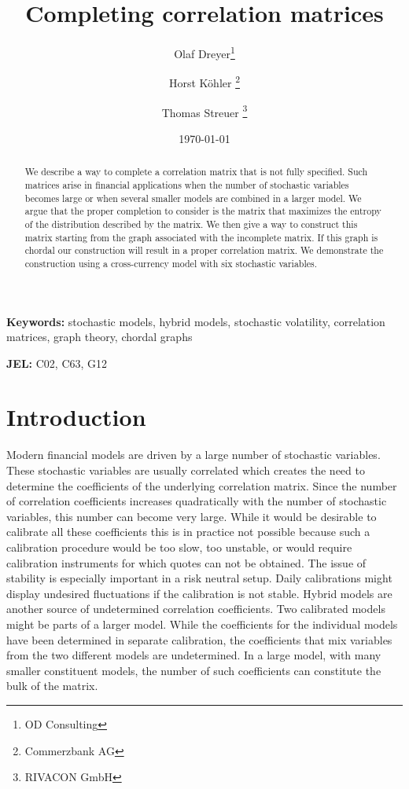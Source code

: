 \documentclass[11pt, a4paper]{article}
\begin{document}
\title{Completing correlation matrices}

\author{Olaf Dreyer\thanks{OD Consulting}
\and Horst K\"ohler \thanks{Commerzbank AG}
\and Thomas Streuer \thanks{RIVACON GmbH} }

\date{\today}

\maketitle

\begin{abstract}
	We describe a way to complete a correlation matrix that is not fully specified. Such matrices arise in financial applications when the number of stochastic variables becomes large or when several smaller models are combined in a larger model. We argue that the proper completion to consider is the matrix that maximizes the entropy of the distribution described by the matrix. We then give a way to construct this matrix starting from the graph associated with the incomplete matrix. If this graph is chordal our construction will result in a proper correlation matrix. We demonstrate the construction using a cross-currency model with six stochastic variables.  
\end{abstract}

\textbf{Keywords:} stochastic models, hybrid models, stochastic volatility, correlation matrices, graph theory, chordal graphs

\textbf{JEL:} C02, C63, G12

\section{Introduction}
Modern financial models are driven by a large number of stochastic variables. These stochastic variables are usually correlated which creates the need to determine the coefficients of the underlying correlation matrix. Since the number of correlation coefficients increases quadratically with the number of stochastic variables, this number can become very large. While it would be desirable to calibrate all these coefficients this is in practice not possible because such a calibration procedure would be too slow, too unstable, or would require calibration instruments for which quotes can not be obtained. The issue of stability is especially important in a risk neutral setup. Daily calibrations might display undesired fluctuations if the calibration is not stable. Hybrid models are another source of undetermined correlation coefficients. Two calibrated models might be parts of a larger model. While the coefficients for the individual models have been determined in separate calibration, the coefficients that mix variables from the two different models are undetermined. In a large model, with many smaller constituent models, the number of such coefficients can constitute the bulk of the matrix. 
\end{document}
